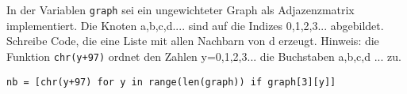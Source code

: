 ﻿\question[3]
In der Variablen \texttt{graph} sei ein ungewichteter Graph als Adjazenzmatrix
implementiert.
Die Knoten a,b,c,d.... sind auf die Indizes 0,1,2,3... abgebildet.
Schreibe Code, die eine Liste mit allen Nachbarn von d erzeugt.
Hinweis: die Funktion \texttt{chr(y+97)} ordnet den Zahlen y=0,1,2,3... die Buchstaben
a,b,c,d ... zu.

\begin{solutionbox}{2cm}
\begin{lstlisting}
nb = [chr(y+97) for y in range(len(graph)) if graph[3][y]]

\end{lstlisting}
\end{solutionbox}

